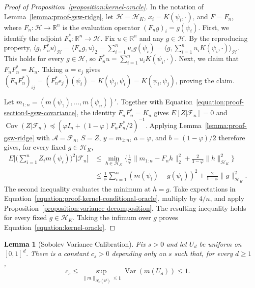 \documentclass[letterpaper,12pt]{article}
\newtheorem{lem}[thm]{Lemma}
\theoremstyle{definition}
\numberwithin{equation}{section}
\newcommand{\mc}{\mathcal}
\newcommand{\norm}[1]{\lVert#1\rVert}
\DeclareMathOperator{\var}{Var}
\DeclareMathOperator{\cov}{Cov}
\begin{document}
\begin{proof}[Proof of Proposition~\ref{proposition:kernel-oracle}]
In the notation of Lemma~\ref{lemma:proof-gsw-ridge}, let $\mathcal H=\mc H_K$, $x_i=K(\psi_i,\cdot)$, and $F=F_n$, where $F_n:\mathcal H\to\mathbb R^n$ is the evaluation operator $(F_ng)_i=g(\psi_i)$.
First, we identify the adjoint $F_n^*:\mathbb R^n\to\mathcal H$.
Fix $u\in\mathbb R^n$ and any $g\in\mathcal H$.
By the reproducing property, $\langle g,F_n^*u\rangle_{\mathcal H}=\langle F_ng,u\rangle_2=\sum_{i=1}^nu_ig(\psi_i)=\langle g,\sum_{i=1}^nu_iK(\psi_i,\cdot)\rangle_{\mathcal H}$.
This holds for every $g\in\mathcal H$, so $F_n^*u=\sum_{i=1}^nu_iK(\psi_i,\cdot)$.
Next, we claim that $F_nF_n^*=K_n$.
Taking $u=e_j$ gives $(F_nF_n^*)_{ij}=(F_n^*e_j)(\psi_i)=K(\psi_j,\psi_i)=K(\psi_i,\psi_j)$, proving the claim.

Let $m_{1:n}=(m(\psi_1),\ldots,m(\psi_n))'$.
Together with Equation~\eqref{equation:proof-section4-gsw-covariance}, the identity $F_nF_n^*=K_n$ gives $E[Z|\mathcal F_n]=0$ and $\cov(Z|\mathcal F_n)\preceq(\varphi I_n+(1-\varphi)F_nF_n^*/2)^{-1}$. Applying Lemma~\ref{lemma:proof-gsw-ridge} with $\mathcal A=\mathcal F_n$, $S=Z$, $y=m_{1:n}$, $a=\varphi$, and $b=(1-\varphi)/2$ therefore gives, for every fixed $g\in\mc H_K$,
\begin{align}
E\bigg[\bigg(\sum_{i=1}^nZ_im(\psi_i)\bigg)^2\big|\mathcal F_n\bigg]&\leq\min_{h\in\mc H_K}\bigg\{\frac1\varphi\norm{m_{1:n}-F_nh}_2^2+\frac2{1-\varphi}\norm{h}_{\mc H_K}^2\bigg\}\nonumber\\
&\leq\frac1\varphi\sum_{i=1}^n(m(\psi_i)-g(\psi_i))^2+\frac2{1-\varphi}\norm{g}_{\mc H_K}^2.\label{equation:proof-kernel-conditional-oracle}
\end{align}
The second inequality evaluates the minimum at $h=g$.
Take expectations in Equation~\eqref{equation:proof-kernel-conditional-oracle}, multiply by $4/n$, and apply Proposition~\ref{proposition:variance-decomposition}. The resulting inequality holds for every fixed $g\in\mc H_K$. Taking the infimum over $g$ proves Equation~\eqref{equation:kernel-oracle}.
\end{proof}

\begin{lem}[Sobolev Variance Calibration]\label{lemma:proof-sobolev-variance-calibration}
Fix $s>0$ and let $U_d$ be uniform on $[0,1]^d$.
There is a constant $c_s>0$ depending only on $s$ such that, for every $d\geq1$,
\begin{equation*}
c_s\leq\sup_{\norm{m}_{H_{\mathrm{av}}^s(\mathbb R^d)}\leq1}\var(m(U_d))\leq1.
\end{equation*}
\end{lem}
\end{document}
